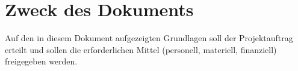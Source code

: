\section{Zweck des Dokuments}
Auf den in diesem Dokument aufgezeigten Grundlagen soll der Projektauftrag erteilt und sollen die erforderlichen Mittel (personell, materiell, finanziell) freigegeben werden.